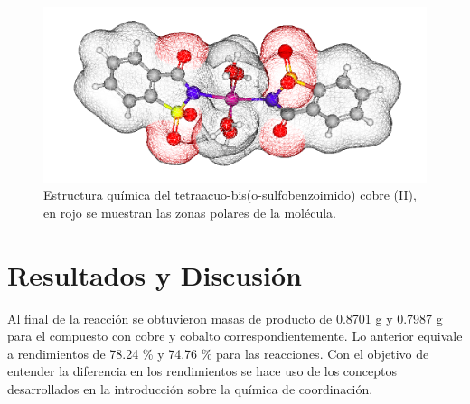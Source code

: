 \documentclass[fleqn,10pt]{SelfArx} %
\begin{document}
	\begin{figure}[h]
		\centering
		\includegraphics[width=\linewidth]{images/SacarineComplex.png}
		\caption{Estructura qu\'imica del tetraacuo-bis(o-sulfobenzoimido) cobre (II), en rojo se muestran las zonas polares de la mol\'ecula.}
		\label{fig: 3d complex}
	\end{figure}
	
	\section{Resultados y Discusi\'on}
	Al final de la reacci\'on se obtuvieron masas de producto de 0.8701 g y 0.7987 g para el compuesto con cobre y cobalto correspondientemente. Lo anterior equivale a rendimientos de 78.24 \% y 74.76 \% para las reacciones. Con el objetivo de entender la diferencia en los rendimientos se hace uso de los conceptos desarrollados en la introducci\'on sobre la qu\'imica de coordinaci\'on.
	
\end{document}
